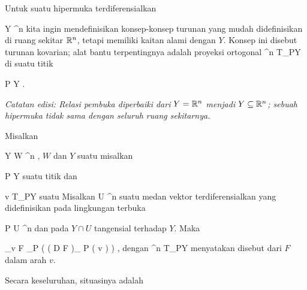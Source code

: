 \setcounter{section}{6}


Untuk suatu hipermuka terdiferensialkan

\mavergleichskette
{\vergleichskette
{ Y
}
{ \subseteq }{ \R^n
}
{  }{
}
{    }{
}
{   }{
}
}
{}{}{}
kita ingin mendefinisikan konsep-konsep turunan yang mudah didefinisikan di ruang sekitar ${\mathbb R}^n$, tetapi memiliki kaitan alami dengan $Y$. Konsep ini disebut turunan kovarian; alat bantu terpentingnya adalah proyeksi ortogonal
 {\R^n } { T_PY
} {}
di suatu titik

\mavergleichskette
{\vergleichskette
{ P
}
{ \in }{ Y
}
{  }{
}
{    }{
}
{   }{
}
}
{}{}{.}

\emph{Catatan edisi: Relasi pembuka diperbaiki dari $Y={\mathbb R}^n$ menjadi $Y\subseteq{\mathbb R}^n$; sebuah hipermuka tidak sama dengan seluruh ruang sekitarnya.}

{}
{

Misalkan

\mavergleichskette
{\vergleichskette
{ Y
}
{ \subseteq }{ W
}
{ \subseteq }{ \R^n
}
{    }{
}
{   }{
}
}
{}{}{,}
$W$
dan $Y$ suatu
misalkan

\mavergleichskette
{\vergleichskette
{ P
}
{ \in }{ Y
}
{  }{
}
{    }{
}
{   }{
}
}
{}{}{}
suatu titik dan

\mavergleichskette
{\vergleichskette
{ v
}
{ \in }{ T_PY
}
{  }{
}
{    }{
}
{   }{
}
}
{}{}{}
suatu
Misalkan
 { U} { \R^n
} {}
suatu medan vektor terdiferensialkan yang didefinisikan pada lingkungan terbuka

\mavergleichskette
{\vergleichskette
{ P
}
{ \in }{ U
}
{ \subseteq }{ \R^n
}
{    }{
}
{   }{
}
}
{}{}{}
dan pada $Y \cap U$ tangensial terhadap $Y$. Maka

\mavergleichskettedisp
{\vergleichskette
{ \nabla_v F
}
{ } { \pi_P   \left(  \left(  D F   \right)_{ P } \left(  v  \right)  \right)
}
{ } {
}
{ } {
}
{ } {
}
}
{}{}{,}
dengan
 {\R^n } { T_PY
} {}
menyatakan
disebut
dari $F$ dalam arah $v$.

}

Secara keseluruhan, situasinya adalah

 {  }

